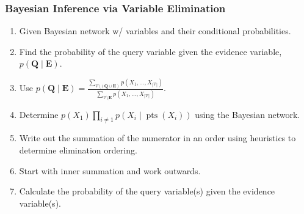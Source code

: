 \subsubsection{Bayesian Inference via Variable Elimination}
\begin{process}
    \begin{enumerate}
        \item Given Bayesian network w/ variables and their conditional probabilities.
        \item Find the probability of the query variable given the evidence variable, $p(\mathbf{Q} \mid \mathbf{E})$.
        \item Use $p(\mathbf{Q} \mid \mathbf{E}) = \frac{\sum_{\mathcal{V} \setminus (\mathbf{Q} \cup \mathbf{E})} p(X_1, \dots, X_{|\mathcal{V}|})}{\sum_{\mathcal{V} \setminus \mathbf{E}} p(X_1, \dots, X_{|\mathcal{V}|})}$.
        \item Determine $p(X_1) \prod_{i \neq 1} p(X_i \mid \operatorname{pts}(X_i))$ using the Bayesian network. 
        \item Write out the summation of the numerator in an order using heuristics to determine elimination ordering. 
        \item Start with inner summation and work outwards.
        \item Calculate the probability of the query variable(s) given the evidence variable(s).
    \end{enumerate}
\end{process}

